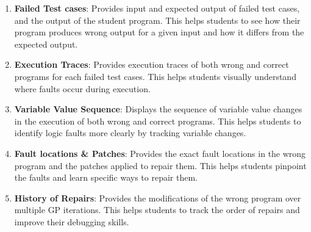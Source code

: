 \documentclass[10pt,conference]{IEEEtran}
\begin{document}
        \begin{enumerate}
            \item \textbf{Failed Test cases}: Provides input and expected output of failed test cases, and the output of the student program. This helps students to see how their program produces wrong output for a given input and how it differs from the expected output.
            
            \item \textbf{Execution Traces}: Provides execution traces of both wrong and correct programs for each failed test cases. This helps students visually understand where faults occur during execution.
            
            \item \textbf{Variable Value Sequence}: Displays the sequence of variable value changes in the execution of both wrong and correct programs. This helps students to identify logic faults more clearly by tracking variable changes.

            \item \textbf{Fault locations \& Patches}: Provides the exact fault locations in the wrong program and the patches applied to repair them. This helps students pinpoint the faults and learn specific ways to repair them.
            
            \item \textbf{History of Repairs}: Provides the modifications of the wrong program over multiple GP iterations. This helps students to track the order of repairs and improve their debugging skills.
        \end{enumerate}
\end{document}
